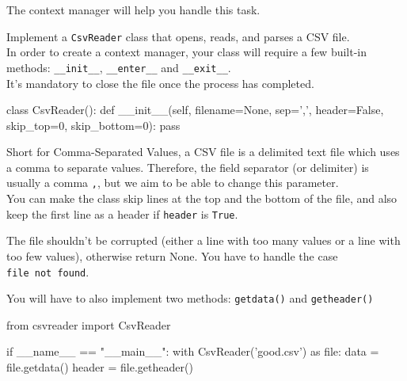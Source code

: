 \documentclass[]{article}
\newenvironment{Shaded}{\begin{snugshade}}{\end{snugshade}}
\newcommand{\BuiltInTok}[1]{\textcolor[rgb]{0.50,0.55,0.55}{#1}}
\newcommand{\ControlFlowTok}[1]{\textcolor[rgb]{0.99,0.74,0.29}{#1}}
\newcommand{\DecValTok}[1]{\textcolor[rgb]{0.96,0.45,0.00}{#1}}
\newcommand{\FunctionTok}[1]{\textcolor[rgb]{0.56,0.27,0.68}{#1}}
\newcommand{\ImportTok}[1]{\textcolor[rgb]{0.15,0.68,0.38}{#1}}
\newcommand{\KeywordTok}[1]{\textcolor[rgb]{0.81,0.81,0.76}{#1}}
\newcommand{\NormalTok}[1]{\textcolor[rgb]{0.81,0.81,0.76}{#1}}
\newcommand{\OperatorTok}[1]{\textcolor[rgb]{0.81,0.81,0.76}{#1}}
\newcommand{\StringTok}[1]{\textcolor[rgb]{0.96,0.31,0.31}{#1}}
\newcommand{\VariableTok}[1]{\textcolor[rgb]{0.15,0.68,0.68}{#1}}
\begin{document}
The context manager will help you handle this task.

Implement a \texttt{CsvReader} class that opens, reads, and parses a CSV
file.\\
In order to create a context manager, your class will require a few
built-in methods: \texttt{\_\_init\_\_}, \texttt{\_\_enter\_\_} and
\texttt{\_\_exit\_\_}.\\
It's mandatory to close the file once the process has completed.

\begin{Shaded}
\begin{Highlighting}[]
\KeywordTok{class}\NormalTok{ CsvReader():}
    \KeywordTok{def} \FunctionTok{__init__}\NormalTok{(}\VariableTok{self}\NormalTok{, filename}\OperatorTok{=}\VariableTok{None}\NormalTok{, sep}\OperatorTok{=}\StringTok{','}\NormalTok{, header}\OperatorTok{=}\VariableTok{False}\NormalTok{, skip_top}\OperatorTok{=}\DecValTok{0}\NormalTok{, skip_bottom}\OperatorTok{=}\DecValTok{0}\NormalTok{):}
        \ControlFlowTok{pass}
\end{Highlighting}
\end{Shaded}

Short for Comma-Separated Values, a CSV file is a delimited text file
which uses a comma to separate values. Therefore, the field separator
(or delimiter) is usually a comma \texttt{,}, but we aim to be able to
change this parameter.\\
You can make the class skip lines at the top and the bottom of the file,
and also keep the first line as a header if \texttt{header} is
\texttt{True}.

The file shouldn't be corrupted (either a line with too many values or a
line with too few values), otherwise return None. You have to handle the
case \texttt{file\ not\ found}.

You will have to also implement two methods: \texttt{getdata()} and
\texttt{getheader()}

\begin{Shaded}
\begin{Highlighting}[]
\ImportTok{from}\NormalTok{ csvreader }\ImportTok{import}\NormalTok{ CsvReader}

\ControlFlowTok{if} \VariableTok{__name__} \OperatorTok{==} \StringTok{"__main__"}\NormalTok{:}
    \ControlFlowTok{with}\NormalTok{ CsvReader(}\StringTok{'good.csv'}\NormalTok{) }\ImportTok{as} \BuiltInTok{file}\NormalTok{:}
\NormalTok{        data }\OperatorTok{=} \BuiltInTok{file}\NormalTok{.getdata()}
\NormalTok{        header }\OperatorTok{=} \BuiltInTok{file}\NormalTok{.getheader()}
\end{Highlighting}
\end{Shaded}
\end{document}
